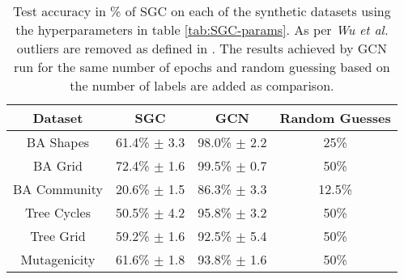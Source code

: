 \begin{table}[h]
    \centering
    \captionsetup{width=.9\textwidth}
    \begin{tabular}{c|c|cc}
        \textbf{Dataset} & \textbf{SGC} & \textbf{GCN} & \textbf{Random Guesses} \\
        \midrule
        BA Shapes       & 61.4\% $\pm$ 3.3 & 98.0\% $\pm$ 2.2 & 25\% \\
        BA Grid         & 72.4\% $\pm$ 1.6 & 99.5\% $\pm$ 0.7 & 50\% \\
        BA Community    & 20.6\% $\pm$ 1.5 & 86.3\% $\pm$ 3.3 & 12.5\% \\
        Tree Cycles     & 50.5\% $\pm$ 4.2 & 95.8\% $\pm$ 3.2 & 50\% \\
        Tree Grid       & 59.2\% $\pm$ 1.6 & 92.5\% $\pm$ 5.4 & 50\% \\
        \midrule
        Mutagenicity    & 61.6\% $\pm$ 1.8 & 93.8\% $\pm$ 1.6 & 50\% \\
    \end{tabular}
    \caption{Test accuracy in \% of SGC on each of the synthetic datasets using the hyperparameters in table \ref{tab:SGC-params}. As per \textit{Wu et al.}\cite{wu2019simplifying} outliers are removed as defined in . The results achieved by GCN run for the same number of epochs and random guessing based on the number of labels are added as comparison.}
    \label{tab:SGC-acc}
\end{table}

